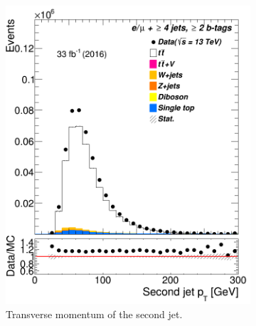\begin{figure} %
	\centering

\begin{subfigure}{0.25\textwidth}
	\includegraphics[width=\linewidth]{ControlPlots_emujets_2016_4incl_2incl/jet1_pt_emujets_2016.png}
	\caption{Transverse momentum of the second jet.} \label{fig:b3}
\end{subfigure}\hspace*{1.0cm}
\begin{subfigure}{0.25\textwidth}

\end{subfigure}
\end{figure}
